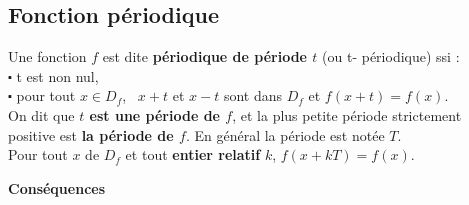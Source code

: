 \subsection{Fonction périodique}
\begin{definition}
 Une fonction $ f $ est dite
\textbf{\color{magenta} périodique de période $ t $} (ou t- périodique) ssi :\\
 $ \centerdot $ t est non nul, \\
$ \centerdot $  pour tout $x\in D_{f} $, \   $  x+t$ et $ x-t$   sont dans $ D_{f} $           et  $f(x+t)=f(x) $.\\
On dit que \textbf{\color{magenta} $t$ est une période de $f$}, et la plus petite période strictement positive est  \textbf{\color{magenta} la période de $f$}.  En général la période est notée $ T $. \\
Pour tout $x$ de $ D_{f} $ et tout \textbf{\color{magenta} entier relatif } $ k $, \colorbox{gray!20!}{$ f(x+kT) = f(x) $. }
\end{definition}

\textbf{\color{blue}Conséquences}


